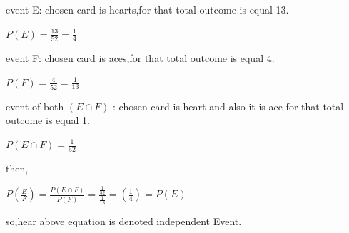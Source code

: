 \documentclass[a4paper,12pt]{article}
\theoremstyle{definition}
\begin{document}
\par event E: chosen card is hearts,for that total outcome is equal 13.\\
\begin{center}
       $P(E)=\frac{13}{52}=\frac{1}{4}$\\
\end{center}
\par event F: chosen card is aces,for that total outcome is equal 4.\\
\begin{center}
       $P(F)=\frac{4}{52}=\frac{1}{13}$\\
\end{center}
\par event of both $(E \cap F)$ : chosen card is heart and also it is ace for that total outcome is equal 1.
\begin{center}
       $P(E \cap F)=\frac{1}{52}$\\
\end{center}
\par then,
\begin{center}
          $ P(\frac{E}{F}) = \frac{P(E\cap F)}{P(F)} = \frac{\frac{1}{52}}{\frac{1}{13} } =(\frac{1}{4}) = P(E)$
\end{center}
\par so,hear above equation is denoted independent Event.
\end{document}
